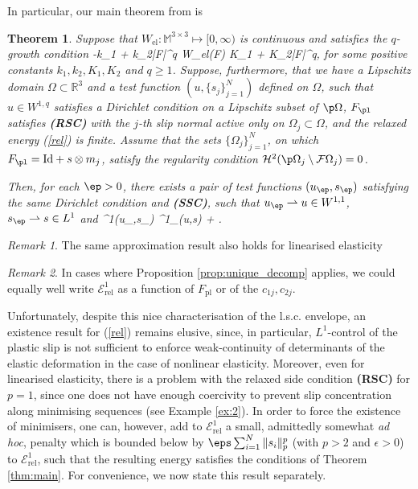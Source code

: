 \documentclass[11pt,reqno]{amsart}
\theoremstyle{plain}
\newtheorem{theorem}{Theorem}
\theoremstyle{definition}
\theoremstyle{remark}
\newtheorem{remark}{Remark}
\begin{document}
In particular, our main theorem from \cite{ang} is
\begin{theorem}\label{thm:nonlinear}
Suppose that $W_{\textrm{el}}:\mathbb{M}^{3\times 3}\mapsto [0,\infty)$ is continuous and satisfies the $q$-growth condition
\be\label{W}
-k_1 + k_2|F|^q \le W_{\textrm{el}}(F) \le K_1 + K_2|F|^q,
\ee
for some positive constants $k_1,k_2,K_1,K_2$ and $q\geq 1$. Suppose, furthermore, that we have a Lipschitz domain $\Omega\subset\mathbb{R}^3$ and a test function $(u,\{s_j\}_{j=1}^N)$ defined on $\Omega$, such that $u\in W^{1,q}$ satisfies a Dirichlet condition on a Lipschitz subset of $\p\Omega$, $F_\pl$ satisfies \textbf{(RSC)} with the $j$-th slip normal active only on $\Omega_j\subset\Omega$, and the relaxed energy (\ref{rel}) is finite. Assume  that the sets $\{\Omega_j\}_{j=1}^N$, on which $F_\pl= \textrm{Id} + s\otimes m_j$, satisfy the regularity condition $\mathcal{H}^2(\p\Omega_j\setminus\mathcal{F}\Omega_j)=0$.
	
Then, for each $\ep>0$, there exists a pair of test functions $(u_{\ep}, s_{\ep})$ satisfying the same Dirichlet condition and \textbf{(SSC)}, such that $u_{\ep}\rightharpoonup u\in W^{1,1}$, $s_{\ep}\rightharpoonup s\in L^1$ and
	\be
	^1(u_{\ep},s_{\ep}) \leq {}^1_{}(u,s) + \ep. 
	\ee
\end{theorem}

\begin{remark}
The same approximation result also holds for linearised elasticity
\end{remark}

\begin{remark}
In cases where Proposition \ref{prop:unique_decomp} applies, we could equally well write $\mathcal{E}^1_{\mathrm{rel}}$ as a function of $F_{\mathrm{pl}}$ or of the $c_{1j}, c_{2j}$.
\end{remark}

Unfortunately, despite this nice characterisation of the l.s.c. envelope, an existence result for (\ref{rel}) remains elusive, since, in particular, $L^1$-control of the plastic slip is not sufficient to enforce weak-continuity of determinants of the elastic deformation in the case of nonlinear elasticity. Moreover, even for linearised elasticity, there is a problem with the relaxed side condition \textbf{(RSC)} for $p=1$, since one does not have enough coercivity to prevent slip concentration along minimising sequences (see Example \ref{ex:2}). In order to force the existence of minimisers, one can, however, add to $\mathcal{E}^1_{\textrm{rel}}$ a small, admittedly somewhat {\em ad hoc}, penalty which is bounded below by $\eps\sum_{i=1}^N\|s_i\|_p^p$ (with $p>2$ and $\epsilon> 0$) to $\mathcal{E}^1_{\textrm{rel}}$, such that the resulting energy satisfies the conditions of Theorem \ref{thm:main}. For convenience, we now state this result separately.
\end{document}
